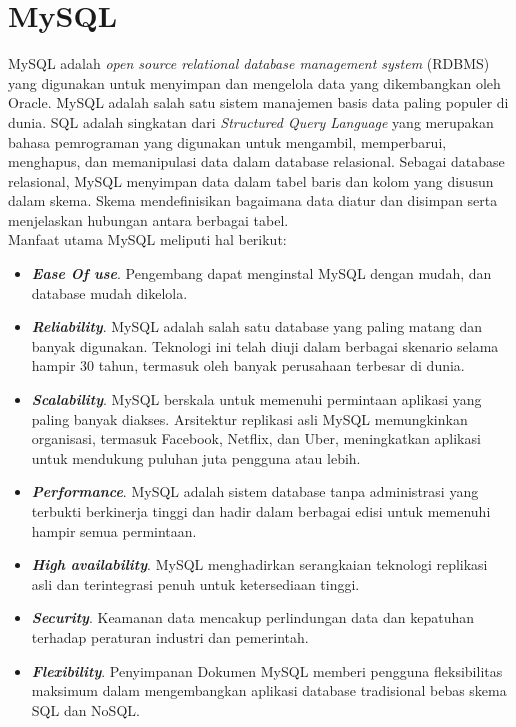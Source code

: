 \section{MySQL}
\label{sec:mysql}
MySQL adalah \textit{open source relational database management system} (RDBMS) yang digunakan untuk menyimpan dan mengelola data yang dikembangkan oleh Oracle. MySQL adalah salah satu sistem manajemen basis data paling populer di dunia. SQL adalah singkatan dari \textit{Structured Query Language} yang merupakan bahasa pemrograman yang digunakan untuk mengambil, memperbarui, menghapus, dan memanipulasi data dalam database relasional. Sebagai database relasional, MySQL menyimpan data dalam tabel baris dan kolom yang disusun dalam skema. Skema mendefinisikan bagaimana data diatur dan disimpan serta menjelaskan hubungan antara berbagai tabel. \\
Manfaat utama MySQL meliputi hal berikut:
\begin{itemize}
    \item \textbf{\textit{Ease Of use}}. Pengembang dapat menginstal MySQL dengan mudah, dan database mudah dikelola.
    \item \textbf{\textit{Reliability}}. MySQL adalah salah satu database yang paling matang dan banyak digunakan. Teknologi ini telah diuji dalam berbagai skenario selama hampir 30 tahun, termasuk oleh banyak perusahaan terbesar di dunia.
    \item \textbf{\textit{Scalability}}. MySQL berskala untuk memenuhi permintaan aplikasi yang paling banyak diakses. Arsitektur replikasi asli MySQL memungkinkan organisasi, termasuk Facebook, Netflix, dan Uber, meningkatkan aplikasi untuk mendukung puluhan juta pengguna atau lebih.
    \item \textbf{\textit{Performance}}. MySQL adalah sistem database tanpa administrasi yang terbukti berkinerja tinggi dan hadir dalam berbagai edisi untuk memenuhi hampir semua permintaan.
    \item \textbf{\textit{High availability}}. MySQL menghadirkan serangkaian teknologi replikasi asli dan terintegrasi penuh untuk ketersediaan tinggi.
    \item \textbf{\textit{Security}}. Keamanan data mencakup perlindungan data dan kepatuhan terhadap peraturan industri dan pemerintah.
    \item \textbf{\textit{Flexibility}}. Penyimpanan Dokumen MySQL memberi pengguna fleksibilitas maksimum dalam mengembangkan aplikasi database tradisional bebas skema SQL dan NoSQL.
\end{itemize}


